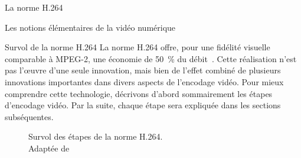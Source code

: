 \begin{chapter}{La norme H.264}
\begin{section}{Les notions élémentaires de la vidéo numérique}
\end{section}

\begin{section}{Survol de la norme H.264}
La norme H.264 offre, pour une fidélité visuelle comparable à MPEG-2, une
économie de 50~\% du débit~\citep{sullivan2005}. Cette réalisation n'est
pas l'œuvre d'une seule innovation, mais bien de l'effet combiné de plusieurs
innovations importantes dans divers aspects de l'encodage vidéo. Pour mieux
comprendre cette technologie, décrivons d'abord sommairement les étapes
d'encodage vidéo. Par la suite, chaque étape sera expliquée dans les
sections subséquentes.

\begin{figure}
\centering {}
\caption[Survol des étapes de la norme H.264]{Survol des étapes de la norme
H.264.\\Adaptée de \citet[p.~2]{schafer2003}}
\label{fig-EncoderOverview}
\end{figure}


\end{section}
\end{chapter}
